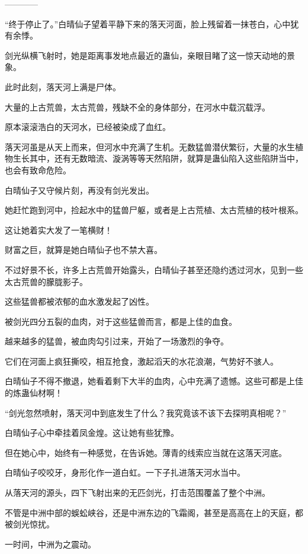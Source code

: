 
\begin{this_body}

------------

“终于停止了。”白晴仙子望着平静下来的落天河面，脸上残留着一抹苍白，心中犹有余悸。

剑光纵横飞射时，她是距离事发地点最近的蛊仙，亲眼目睹了这一惊天动地的景象。

此时此刻，落天河上满是尸体。

大量的上古荒兽，太古荒兽，残缺不全的身体部分，在河水中载沉载浮。

原本滚滚浩白的天河水，已经被染成了血红。

落天河虽是从天上而来，但河水中充满了生机。无数猛兽潜伏繁衍，大量的水生植物生长其中，还有无数暗流、漩涡等等天然陷阱，就算是蛊仙陷入这些陷阱当中，也会有致命危险。

白晴仙子又守候片刻，再没有剑光发出。

她赶忙跑到河中，捡起水中的猛兽尸躯，或者是上古荒植、太古荒植的枝叶根系。

这让她着实大发了一笔横财！

财富之巨，就算是她白晴仙子也不禁大喜。

不过好景不长，许多上古荒兽开始露头，白晴仙子甚至还隐约透过河水，见到一些太古荒兽的朦胧影子。

这些猛兽都被浓郁的血水激发起了凶性。

被剑光四分五裂的血肉，对于这些猛兽而言，都是上佳的血食。

越来越多的猛兽，被血肉勾引过来，开始了一场激烈的争夺。

它们在河面上疯狂撕咬，相互抢食，激起滔天的水花浪潮，气势好不骇人。

白晴仙子不得不撤退，她看着剩下大半的血肉，心中充满了遗憾。这些可都是上佳的炼蛊仙材啊！

“剑光忽然喷射，落天河中到底发生了什么？我究竟该不该下去探明真相呢？”

白晴仙子心中牵挂着凤金煌。这让她有些犹豫。

但在她心中，始终有一种感觉，在告诉她。薄青的线索应当就在这落天河底。

白晴仙子咬咬牙，身形化作一道白虹。一下子扎进落天河水当中。

从落天河的源头，四下飞射出来的无匹剑光，打击范围覆盖了整个中洲。

不管是中洲中部的蜈蚣峡谷，还是中洲东边的飞霜阁，甚至是高高在上的天庭，都被剑光惊扰。

一时间，中洲为之震动。


\end{this_body}
